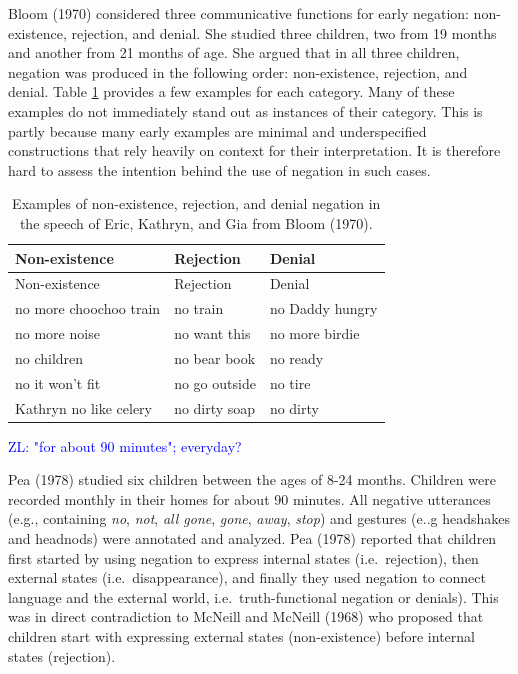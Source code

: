 \documentclass[
  english,
  man,floatsintext]{apa6}
\begin{document}
Bloom (1970) considered three communicative functions for early negation: non-existence, rejection, and denial. She studied three children, two from 19 months and another from 21 months of age. She argued that in all three children, negation was produced in the following order: non-existence, rejection, and denial. Table \ref{tab:bloom} provides a few examples for each category. Many of these examples do not immediately stand out as instances of their category. This is partly because many early examples are minimal and underspecified constructions that rely heavily on context for their interpretation. It is therefore hard to assess the intention behind the use of negation in such cases.

\begin{longtable}[]{@{}lll@{}}
\caption{\label{tab:bloom} Examples of non-existence, rejection, and denial negation in the speech of Eric, Kathryn, and Gia from Bloom (1970).}\tabularnewline
\toprule
Non-existence & Rejection & Denial \\
\midrule
\endfirsthead
\toprule
Non-existence & Rejection & Denial \\
\midrule
\endhead
no more choochoo train & no train & no Daddy hungry \\
no more noise & no want this & no more birdie \\
no children & no bear book & no ready \\
no it won't fit & no go outside & no tire \\
Kathryn no like celery & no dirty soap & no dirty \\
\bottomrule
\end{longtable}

\textcolor{blue}{ZL: "for about 90 minutes"; everyday?}

Pea (1978) studied six children between the ages of 8-24 months. Children were recorded monthly in their homes for about 90 minutes. All negative utterances (e.g., containing \emph{no}, \emph{not}, \emph{all gone}, \emph{gone}, \emph{away}, \emph{stop}) and gestures (e..g headshakes and headnods) were annotated and analyzed. Pea (1978) reported that children first started by using negation to express internal states (i.e.~rejection), then external states (i.e.~disappearance), and finally they used negation to connect language and the external world, i.e.~truth-functional negation or denials). This was in direct contradiction to McNeill and McNeill (1968) who proposed that children start with expressing external states (non-existence) before internal states (rejection).
\end{document}
